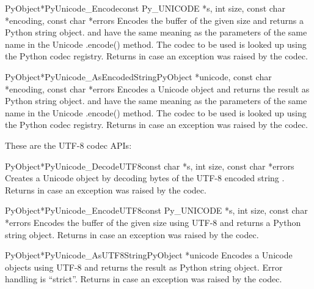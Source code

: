 \documentclass{manual}
\begin{document}
\begin{cfuncdesc}{PyObject*}{PyUnicode_Encode}{const Py_UNICODE *s,
                                               int size,
                                               const char *encoding,
                                               const char *errors}
Encodes the  buffer of the given size and returns a
Python string object.  and  have the same
meaning as the parameters of the same name in the Unicode .encode()
method. The codec to be used is looked up using the Python codec
registry. Returns \NULL{} in case an exception was raised by the
codec.
\end{cfuncdesc}

\begin{cfuncdesc}{PyObject*}{PyUnicode_AsEncodedString}{PyObject *unicode,
                                               const char *encoding,
                                               const char *errors}
Encodes a Unicode object and returns the result as Python string
object.  and  have the same meaning as the
parameters of the same name in the Unicode .encode() method. The codec
to be used is looked up using the Python codec registry. Returns
\NULL{} in case an exception was raised by the codec.
\end{cfuncdesc}


These are the UTF-8 codec APIs:

\begin{cfuncdesc}{PyObject*}{PyUnicode_DecodeUTF8}{const char *s,
                                               int size,
                                               const char *errors}
Creates a Unicode object by decoding  bytes of the UTF-8
encoded string . Returns \NULL{} in case an exception was
raised by the codec.
\end{cfuncdesc}

\begin{cfuncdesc}{PyObject*}{PyUnicode_EncodeUTF8}{const Py_UNICODE *s,
                                               int size,
                                               const char *errors}
Encodes the  buffer of the given size using UTF-8
and returns a Python string object.  Returns \NULL{} in case an
exception was raised by the codec.
\end{cfuncdesc}

\begin{cfuncdesc}{PyObject*}{PyUnicode_AsUTF8String}{PyObject *unicode}
Encodes a Unicode objects using UTF-8 and returns the result as Python
string object. Error handling is ``strict''. Returns
\NULL{} in case an exception was raised by the codec.
\end{cfuncdesc}
\end{document}
